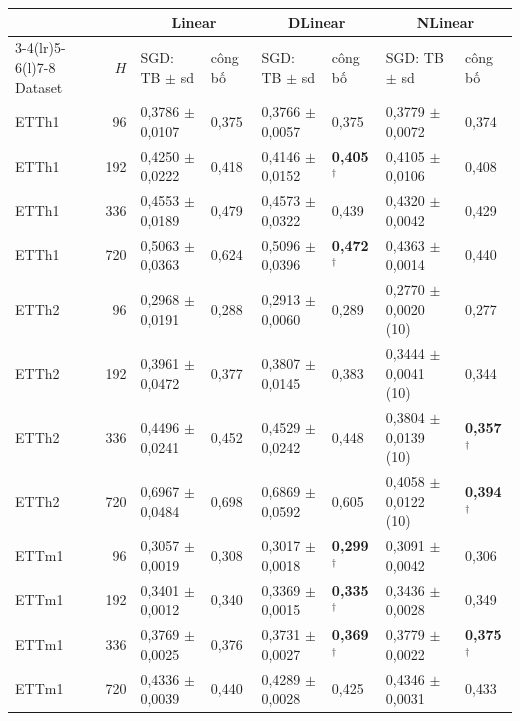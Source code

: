 \begin{tabular}{@{}lr ll ll ll@{}}
\toprule
 & & \multicolumn{2}{c}{Linear} & \multicolumn{2}{c}{DLinear} & \multicolumn{2}{c}{NLinear} \\
\cmidrule(lr){3-4}\cmidrule(lr){5-6}\cmidrule(l){7-8}
Dataset & $H$ & SGD: TB $\pm$ sd & công bố & SGD: TB $\pm$ sd & công bố & SGD: TB $\pm$ sd & công bố \\
\midrule
ETTh1 & 96 & 0{,}3786 $\pm$ 0{,}0107 & 0{,}375 & 0{,}3766 $\pm$ 0{,}0057 & 0{,}375 & 0{,}3779 $\pm$ 0{,}0072 & 0{,}374 \\
ETTh1 & 192 & 0{,}4250 $\pm$ 0{,}0222 & 0{,}418 & 0{,}4146 $\pm$ 0{,}0152 & \textbf{0{,}405}$^\dagger$ & 0{,}4105 $\pm$ 0{,}0106 & 0{,}408 \\
ETTh1 & 336 & 0{,}4553 $\pm$ 0{,}0189 & 0{,}479 & 0{,}4573 $\pm$ 0{,}0322 & 0{,}439 & 0{,}4320 $\pm$ 0{,}0042 & 0{,}429 \\
ETTh1 & 720 & 0{,}5063 $\pm$ 0{,}0363 & 0{,}624 & 0{,}5096 $\pm$ 0{,}0396 & \textbf{0{,}472}$^\dagger$ & 0{,}4363 $\pm$ 0{,}0014 & 0{,}440 \\
\addlinespace[3pt]
ETTh2 & 96 & 0{,}2968 $\pm$ 0{,}0191 & 0{,}288 & 0{,}2913 $\pm$ 0{,}0060 & 0{,}289 & 0{,}2770 $\pm$ 0{,}0020 (10) & 0{,}277 \\
ETTh2 & 192 & 0{,}3961 $\pm$ 0{,}0472 & 0{,}377 & 0{,}3807 $\pm$ 0{,}0145 & 0{,}383 & 0{,}3444 $\pm$ 0{,}0041 (10) & 0{,}344 \\
ETTh2 & 336 & 0{,}4496 $\pm$ 0{,}0241 & 0{,}452 & 0{,}4529 $\pm$ 0{,}0242 & 0{,}448 & 0{,}3804 $\pm$ 0{,}0139 (10) & \textbf{0{,}357}$^\dagger$ \\
ETTh2 & 720 & 0{,}6967 $\pm$ 0{,}0484 & 0{,}698 & 0{,}6869 $\pm$ 0{,}0592 & 0{,}605 & 0{,}4058 $\pm$ 0{,}0122 (10) & \textbf{0{,}394}$^\dagger$ \\
\addlinespace[3pt]
ETTm1 & 96 & 0{,}3057 $\pm$ 0{,}0019 & 0{,}308 & 0{,}3017 $\pm$ 0{,}0018 & \textbf{0{,}299}$^\dagger$ & 0{,}3091 $\pm$ 0{,}0042 & 0{,}306 \\
ETTm1 & 192 & 0{,}3401 $\pm$ 0{,}0012 & 0{,}340 & 0{,}3369 $\pm$ 0{,}0015 & \textbf{0{,}335}$^\dagger$ & 0{,}3436 $\pm$ 0{,}0028 & 0{,}349 \\
ETTm1 & 336 & 0{,}3769 $\pm$ 0{,}0025 & 0{,}376 & 0{,}3731 $\pm$ 0{,}0027 & \textbf{0{,}369}$^\dagger$ & 0{,}3779 $\pm$ 0{,}0022 & \textbf{0{,}375}$^\dagger$ \\
ETTm1 & 720 & 0{,}4336 $\pm$ 0{,}0039 & 0{,}440 & 0{,}4289 $\pm$ 0{,}0028 & 0{,}425 & 0{,}4346 $\pm$ 0{,}0031 & 0{,}433 \\
\bottomrule
\end{tabular}
